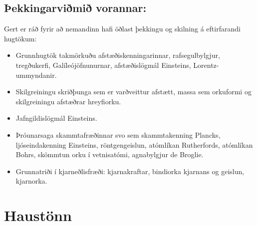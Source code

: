 \subsection*{Þekkingarviðmið vorannar:}

Gert er ráð fyrir að nemandinn hafi öðlast þekkingu og skilning á eftirfarandi hugtökum:

\begin{itemize}
    \item Grunnhugtök takmörkuðu afstæðiskenningarinnar, rafsegulbylgjur,  tregðukerfi, Galíleójöfnunurnar, afstæðislögmál Einsteins, Lorentz-ummyndanir.
    \item Skilgreiningu skriðþunga sem er varðveittur afstætt, massa sem orkuformi og skilgreiningu afstæðrar hreyfiorku.
    \item Jafngildislögmál Einsteins.
    \item Þróunarsaga skammtafræðinnar svo sem skammtakenning Plancks, ljóseindakenning Einsteins, röntgengeislun, atómlíkan Rutherfords, atómlíkan Bohrs, skömmtun orku í vetnisatómi, agnabylgjur de Broglie.
    \item Grunnatriði í kjarneðlisfræði: kjarnakraftar, bindiorka kjarnans og geislun, kjarnorka.
\end{itemize}


\newpage

\section*{Haustönn}

